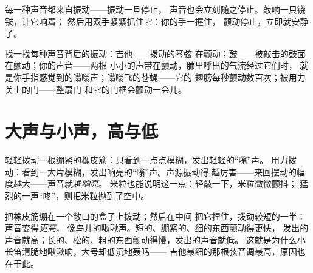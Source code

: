 \begin{proposition}\label{prop:g3:sound-around-us:novib}
每一种声音都来自振动——振动一旦停止，
声音也会立刻随之停止。敲响一只铙钹，让它响着；
然后用双手紧紧抓住它：你的手一握住，
颤动停止，立即就安静了。
\end{proposition}

\begin{example}[处处都有声源]\label{ex:g3:sound-around-us:sources}
找一找每种声音背后的振动：吉他——拨动的琴弦
在颤动；鼓——被敲击的鼓面在颤动；你的声音——两根
小小的声带在颤动，肺里呼出的气流经过它们时，
就是你手指感觉到的嗡嗡声；嗡嗡飞的苍蝇——它的
翅膀每秒颤动数百次；被用力关上的门——整扇门
和它的门框会颤动一会儿。
\end{example}

\section{大声与小声，高与低}

\begin{example}[响亮就是振动幅度大]\label{ex:g3:sound-around-us:loud}
轻轻拨动一根绷紧的橡皮筋：只看到一点点模糊，发出轻轻的“嗡”声。
用力拨动：看到一大片模糊，发出响亮的“嗡”声。声源振动得
越厉害——来回摆动的幅度越大——声音就越\emph{响亮}。
米粒也能说明这一点：轻敲一下，米粒微微颤抖；
猛烈的一声“咚”，则把米粒抛到了空中。
\end{example}

\begin{example}[高与低]\label{ex:g3:sound-around-us:pitch}
把橡皮筋绷在一个敞口的盒子上拨动；然后在中间
把它捏住，拨动较短的一半：声音变得\emph{更高}，
像鸟儿的啾啾声。短的、绷紧的、细的东西颤动得更快，
发出的声音就高；长的、松的、粗的东西颤动得慢，发出的声音就低。
这就是为什么小长笛清脆地啾啾响，大号却低沉地轰鸣——
吉他最细的那根弦音调最高，原因也在于此。
\end{example}

